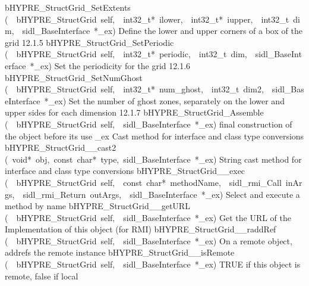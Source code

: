 \documentclass{article}
\begin{document}
\begin{cxxentry}
\begin{cxxentry}
\begin{cxxnames}
        {bHYPRE\_StructGrid\_SetExtents}
        {(\ \ bHYPRE\_StructGrid\ self,\ \ int32\_t*\ ilower,\ \ int32\_t*\ iupper,\ \ int32\_t\ dim,\ \ sidl\_BaseInterface\ *\_ex)}
        {
Define the lower and upper corners of a box of the grid}
        {12.1.5}
        {bHYPRE\_StructGrid\_SetPeriodic}
        {(\ \ bHYPRE\_StructGrid\ self,\ \ int32\_t*\ periodic,\ \ int32\_t\ dim,\ \ sidl\_BaseInterface\ *\_ex)}
        {
Set the periodicity for the grid}
        {12.1.6}
        {bHYPRE\_StructGrid\_SetNumGhost}
        {(\ \ bHYPRE\_StructGrid\ self,\ \ int32\_t*\ num\_ghost,\ \ int32\_t\ dim2,\ \ sidl\_BaseInterface\ *\_ex)}
        {
Set the number of ghost zones, separately on the lower and upper sides
for each dimension}
        {12.1.7}
        {bHYPRE\_StructGrid\_Assemble}
        {(\ \ bHYPRE\_StructGrid\ self,\ \ sidl\_BaseInterface\ *\_ex)}
        {
final construction of the object before its use }
        {}
\label{cxx.12.1.14}
        {\_ex}
        {}
        {
Cast method for interface and class type conversions}
        {}
\label{cxx.12.1.15}
        {bHYPRE\_StructGrid\_\_cast2}
        {(\ void*\ obj,\ const\ char*\ type,\ sidl\_BaseInterface\ *\_ex)}
        {
String cast method for interface and class type conversions}
        {}
\label{cxx.12.1.16}
        {bHYPRE\_StructGrid\_\_exec}
        {(\ \ bHYPRE\_StructGrid\ self,\ \ const\ char*\ methodName,\ \ sidl\_rmi\_Call\ inArgs,\ \ sidl\_rmi\_Return\ outArgs,\ \ sidl\_BaseInterface\ *\_ex)}
        {
Select and execute a method by name}
        {}
\label{cxx.12.1.17}
        {bHYPRE\_StructGrid\_\_getURL}
        {(\ \ bHYPRE\_StructGrid\ self,\ \ sidl\_BaseInterface\ *\_ex)}
        {
Get the URL of the Implementation of this object (for RMI)}
        {}
\label{cxx.12.1.18}
        {bHYPRE\_StructGrid\_\_raddRef}
        {(\ \ bHYPRE\_StructGrid\ self,\ \ sidl\_BaseInterface\ *\_ex)}
        {
On a remote object, addrefs the remote instance}
        {}
\label{cxx.12.1.19}
        {bHYPRE\_StructGrid\_\_isRemote}
        {(\ \ bHYPRE\_StructGrid\ self,\ \ sidl\_BaseInterface\ *\_ex)}
        {
TRUE if this object is remote, false if local}

\end{cxxnames}
\end{cxxentry}
\end{cxxentry}
\end{document}
